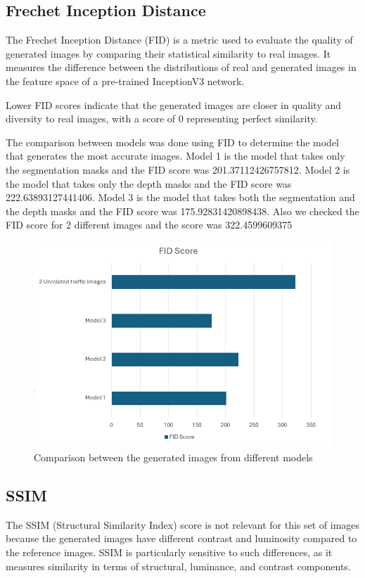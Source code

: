 \documentclass[12pt,a4paper]{report}
\begin{document}
\subsection*{ Frechet Inception Distance}

The Frechet Inception Distance (FID) is a metric used to evaluate the quality of generated images by comparing their statistical similarity to real images. It measures the difference between the distributions of real and generated images in the feature space of a pre-trained InceptionV3 network.

Lower FID scores indicate that the generated images are closer in quality and diversity to real images, with a score of 0 representing perfect similarity.

The comparison between models was done using FID to determine the model that generates the most accurate images.
Model 1 is the model that takes only the segmentation masks and the FID score was 201.37112426757812.
Model 2 is the model that takes only the depth masks and the FID score was 222.63893127441406.
Model 3 is the model that takes both the segmentation and the depth masks and the FID score was 175.92831420898438.
Also we checked the FID score for 2 different images and the score was 322.4599609375

\begin{figure}
    \centering
    \includegraphics[width=1\linewidth]{fid.png}
    \caption{Comparison between the generated images from different models}
    \label{fig:enter-label}
\end{figure}

\subsection*{ SSIM}

The SSIM (Structural Similarity Index) score is not relevant for this set of images because the generated images have different contrast and luminosity compared to the reference images. SSIM is particularly sensitive to such differences, as it measures similarity in terms of structural, luminance, and contrast components.

\end{document}
